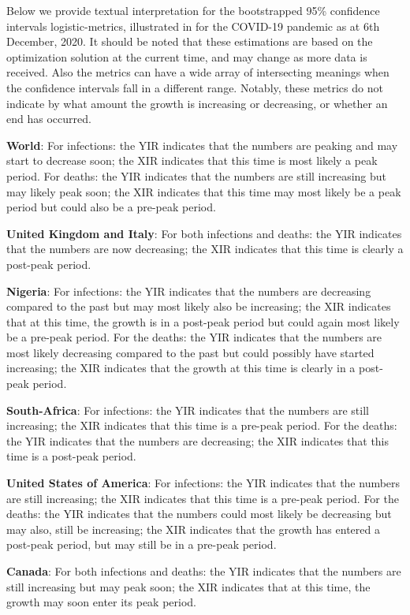 \documentclass[journal]{IEEEtran}
\theoremstyle{plain}
\theoremstyle{definition}
\theoremstyle{remark}
\begin{document}
Below we provide textual interpretation for the bootstrapped 95\% confidence intervals logistic-metrics, illustrated in  for the COVID-19 pandemic as at 6th December, 2020. It should be noted that these estimations are based on the optimization solution at the current time, and may change as more data is received. Also the metrics can have a wide array of intersecting meanings when the confidence intervals fall in a different range. Notably, these metrics do not indicate by what amount the growth is increasing or decreasing, or whether an end has occurred.

\textbf{World}: For infections: the YIR indicates that the numbers are peaking and may start to decrease soon; the XIR indicates that this time is most likely a peak period. For deaths: the YIR indicates that the numbers are still increasing but may likely peak soon; the XIR indicates that this time may most likely be a peak period but could also be a pre-peak period.

\textbf{United Kingdom and Italy}: For both infections and deaths: the YIR indicates that the numbers are now decreasing; the XIR indicates that this time is clearly a post-peak period.

\textbf{Nigeria}: For infections: the YIR indicates that the numbers are decreasing compared to the past but may most likely also be increasing; the XIR indicates that at this time, the growth is in a post-peak period but could again most likely be a pre-peak period. For the deaths: the YIR indicates that the numbers are most likely decreasing compared to the past but could possibly have started increasing; the XIR indicates that the growth at this time is clearly in a post-peak period.

\textbf{South-Africa}: For infections: the YIR indicates that the numbers are still increasing; the XIR indicates that this time is a pre-peak period. For the deaths: the YIR indicates that the numbers are decreasing; the XIR indicates that this time is a post-peak period.

\textbf{United States of America}: For infections: the YIR indicates that the numbers are still increasing; the XIR indicates that this time is a pre-peak period. For the deaths: the YIR indicates that the numbers could most likely be decreasing but may also, still be increasing; the XIR indicates that the growth has entered a post-peak period, but may still be in a pre-peak period.

\textbf{Canada}: For both infections and deaths: the YIR indicates that the numbers are still increasing but may peak soon; the XIR indicates that at this time, the growth may soon enter its peak period.
\end{document}
